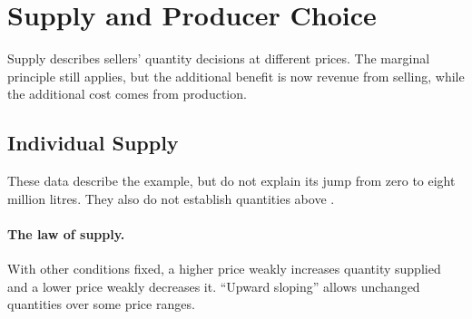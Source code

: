 \section{Supply and Producer Choice}
Supply describes sellers' quantity decisions at different prices.
The marginal principle still applies, but the additional benefit is now
revenue from selling, while the additional cost comes from production.

\subsection{Individual Supply}

These data describe the example, but do not explain its jump from zero to
eight million litres. They also do not establish quantities above
.

\paragraph{The law of supply.}
With other conditions fixed, a higher price weakly increases quantity
supplied and a lower price weakly decreases it. ``Upward sloping'' allows
unchanged quantities over some price ranges.

